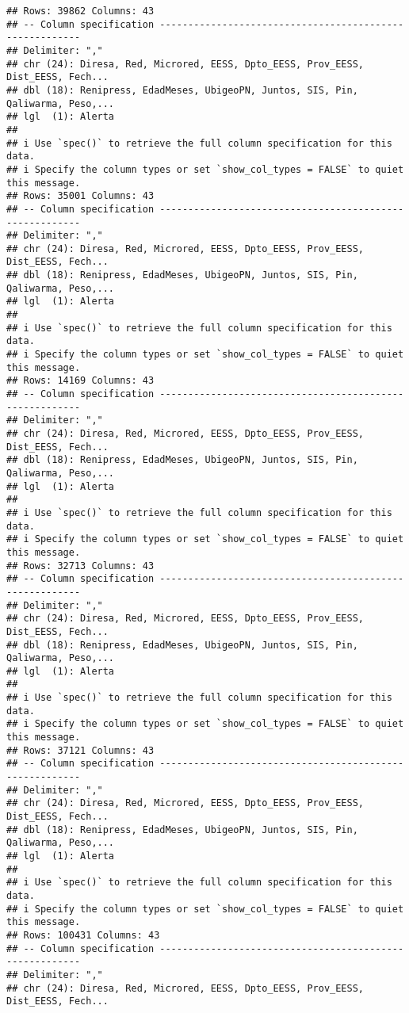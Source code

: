 \documentclass[
]{article}
\begin{document}
\begin{verbatim}
## Rows: 39862 Columns: 43
## -- Column specification --------------------------------------------------------
## Delimiter: ","
## chr (24): Diresa, Red, Microred, EESS, Dpto_EESS, Prov_EESS, Dist_EESS, Fech...
## dbl (18): Renipress, EdadMeses, UbigeoPN, Juntos, SIS, Pin, Qaliwarma, Peso,...
## lgl  (1): Alerta
## 
## i Use `spec()` to retrieve the full column specification for this data.
## i Specify the column types or set `show_col_types = FALSE` to quiet this message.
## Rows: 35001 Columns: 43
## -- Column specification --------------------------------------------------------
## Delimiter: ","
## chr (24): Diresa, Red, Microred, EESS, Dpto_EESS, Prov_EESS, Dist_EESS, Fech...
## dbl (18): Renipress, EdadMeses, UbigeoPN, Juntos, SIS, Pin, Qaliwarma, Peso,...
## lgl  (1): Alerta
## 
## i Use `spec()` to retrieve the full column specification for this data.
## i Specify the column types or set `show_col_types = FALSE` to quiet this message.
## Rows: 14169 Columns: 43
## -- Column specification --------------------------------------------------------
## Delimiter: ","
## chr (24): Diresa, Red, Microred, EESS, Dpto_EESS, Prov_EESS, Dist_EESS, Fech...
## dbl (18): Renipress, EdadMeses, UbigeoPN, Juntos, SIS, Pin, Qaliwarma, Peso,...
## lgl  (1): Alerta
## 
## i Use `spec()` to retrieve the full column specification for this data.
## i Specify the column types or set `show_col_types = FALSE` to quiet this message.
## Rows: 32713 Columns: 43
## -- Column specification --------------------------------------------------------
## Delimiter: ","
## chr (24): Diresa, Red, Microred, EESS, Dpto_EESS, Prov_EESS, Dist_EESS, Fech...
## dbl (18): Renipress, EdadMeses, UbigeoPN, Juntos, SIS, Pin, Qaliwarma, Peso,...
## lgl  (1): Alerta
## 
## i Use `spec()` to retrieve the full column specification for this data.
## i Specify the column types or set `show_col_types = FALSE` to quiet this message.
## Rows: 37121 Columns: 43
## -- Column specification --------------------------------------------------------
## Delimiter: ","
## chr (24): Diresa, Red, Microred, EESS, Dpto_EESS, Prov_EESS, Dist_EESS, Fech...
## dbl (18): Renipress, EdadMeses, UbigeoPN, Juntos, SIS, Pin, Qaliwarma, Peso,...
## lgl  (1): Alerta
## 
## i Use `spec()` to retrieve the full column specification for this data.
## i Specify the column types or set `show_col_types = FALSE` to quiet this message.
## Rows: 100431 Columns: 43
## -- Column specification --------------------------------------------------------
## Delimiter: ","
## chr (24): Diresa, Red, Microred, EESS, Dpto_EESS, Prov_EESS, Dist_EESS, Fech...

\end{verbatim}
\end{document}

